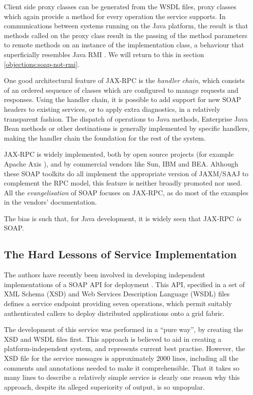 Client side proxy classes can be generated from the WSDL files, proxy
classes which again provide a method for every operation the service
supports. In communications between systems running on the Java
platform, the result is that methods called on the proxy class result
in the passing of the method parameters to remote methods on an
instance of the implementation class, a behaviour that superficially
resembles Java RMI \cite{paper:RMI}. We will return to this in section
\ref{objections:soap-not-rmi}.

One good architectural feature of JAX-RPC is the \emph{handler chain},
which consists of an ordered sequence of classes which are configured
to manage requests and responses. Using the handler chain, it is
possible to add support for new SOAP headers to existing services, or
to apply extra diagnostics, in a relatively transparent fashion. The
dispatch of operations to Java methods, Enterprise Java Bean methods
or other destinations is generally implemented by specific handlers,
making the handler chain the foundation for the rest of the system.

JAX-RPC is widely implemented, both by open source projects (for
example Apache Axis \cite{apache:axis}), and by commercial vendors
like Sun, IBM and BEA. Although these SOAP toolkits do all implement
the appropriate version of JAXM/SAAJ to complement the RPC model, this
feature is neither broadly promoted nor used. All the
\emph{evangelisation} of SOAP focuses on JAX-RPC, as do most of the
examples in the vendors' documentation.

The bias is such that, for Java development, it is widely seen that
JAX-RPC \emph{is} SOAP.

\subsection{The Hard Lessons of Service Implementation}
\label{intro:experience}

The authors have recently been involved in developing independent
implementations of a SOAP API for deployment \cite{draft:CDDLM}. This
API, specified in a set of XML Schema (XSD) \cite{spec:XSD} and Web
Services Description Language (WSDL) files \cite{spec:WSDL-11} defines
a service endpoint providing seven operations, which permit suitably
authenticated callers to deploy distributed applications onto a grid
fabric.

The development of this service was performed in a ``pure way'', by
creating the XSD and WSDL files first. This approach is believed to
aid in creating a platform-independent system, and represents current
best practise. However, the XSD file for the service messages is
approximately 2000 lines, including all the comments and annotations
needed to make it comprehensible. That it takes so many lines to
describe a relatively simple service is clearly one reason why this
approach, despite its alleged superiority of output, is so unpopular.

